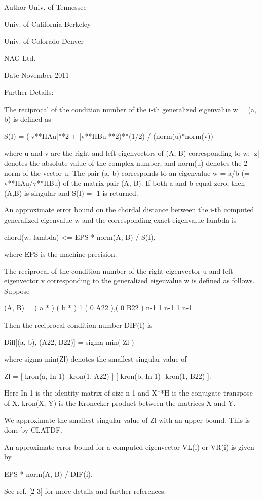 \begin{DoxyAuthor}{Author}
Univ. of Tennessee 

Univ. of California Berkeley 

Univ. of Colorado Denver 

N\+A\+G Ltd. 
\end{DoxyAuthor}
\begin{DoxyDate}{Date}
November 2011 
\end{DoxyDate}
\begin{DoxyParagraph}{Further Details\+: }
\begin{DoxyVerb}  The reciprocal of the condition number of the i-th generalized
  eigenvalue w = (a, b) is defined as

          S(I) = (|v**HAu|**2 + |v**HBu|**2)**(1/2) / (norm(u)*norm(v))

  where u and v are the right and left eigenvectors of (A, B)
  corresponding to w; |z| denotes the absolute value of the complex
  number, and norm(u) denotes the 2-norm of the vector u. The pair
  (a, b) corresponds to an eigenvalue w = a/b (= v**HAu/v**HBu) of the
  matrix pair (A, B). If both a and b equal zero, then (A,B) is
  singular and S(I) = -1 is returned.

  An approximate error bound on the chordal distance between the i-th
  computed generalized eigenvalue w and the corresponding exact
  eigenvalue lambda is

          chord(w, lambda) <=   EPS * norm(A, B) / S(I),

  where EPS is the machine precision.

  The reciprocal of the condition number of the right eigenvector u
  and left eigenvector v corresponding to the generalized eigenvalue w
  is defined as follows. Suppose

                   (A, B) = ( a   *  ) ( b  *  )  1
                            ( 0  A22 ),( 0 B22 )  n-1
                              1  n-1     1 n-1

  Then the reciprocal condition number DIF(I) is

          Difl[(a, b), (A22, B22)]  = sigma-min( Zl )

  where sigma-min(Zl) denotes the smallest singular value of

         Zl = [ kron(a, In-1) -kron(1, A22) ]
              [ kron(b, In-1) -kron(1, B22) ].

  Here In-1 is the identity matrix of size n-1 and X**H is the conjugate
  transpose of X. kron(X, Y) is the Kronecker product between the
  matrices X and Y.

  We approximate the smallest singular value of Zl with an upper
  bound. This is done by CLATDF.

  An approximate error bound for a computed eigenvector VL(i) or
  VR(i) is given by

                      EPS * norm(A, B) / DIF(i).

  See ref. [2-3] for more details and further references.\end{DoxyVerb}
 
\end{DoxyParagraph}
